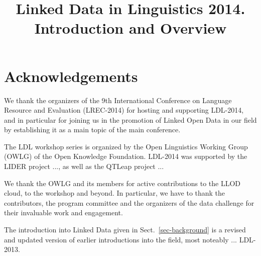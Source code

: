 \documentclass[10pt, a4paper]{article}
\title{Linked Data in Linguistics 2014. Introduction and Overview}
\begin{document}
\maketitleabstract





\section*{Acknowledgements}

We thank the organizers of the 9th International Conference on Language Resource and Evaluation (LREC-2014) for hosting and supporting LDL-2014, and in particular for joining us in the promotion of Linked Open Data in our field by establishing it as a main topic of the main conference.

The LDL workshop series is organized by the Open Linguistics Working Group (OWLG) of the Open Knowledge Foundation. LDL-2014 was supported by the LIDER project ..., as well as the QTLeap project ...

We thank the OWLG and its members for active contributions to the LLOD cloud, to the workshop and beyond. In particular, we have to thank the contributors, the program committee and the organizers of the data challenge for their invaluable work and engagement.

The introduction into Linked Data given in Sect.\ \ref{sec-background} is a revised and updated version of earlier introductions into the field, most noteably ... LDL-2013.




\newpage
\end{document}
